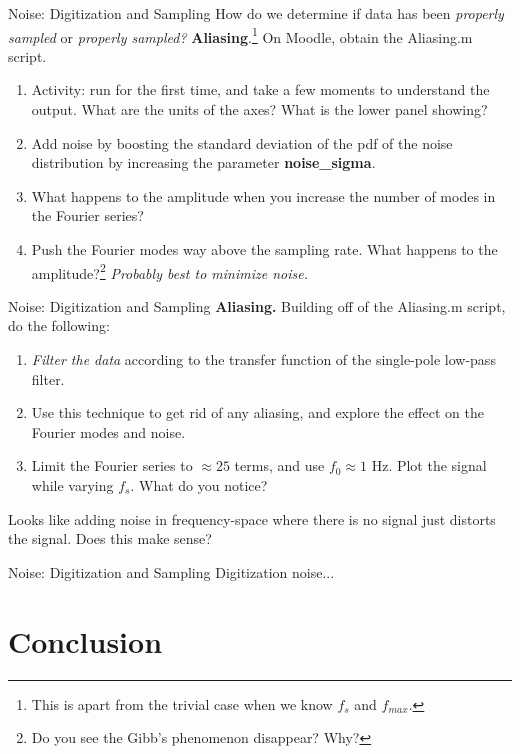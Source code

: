 \documentclass{beamer}
\begin{document}
\begin{frame}{Noise: Digitization and Sampling}
\small
How do we determine if data has been \textit{properly sampled} or \textit{properly sampled?} \textbf{Aliasing}.\footnote{This is apart from the trivial case when we know $f_s$ and $f_{max}$.} On Moodle, obtain the Aliasing.m script.
\begin{enumerate}
\item Activity: run for the first time, and take a few moments to understand the output. What are the units of the axes? What is the lower panel showing? 
\item Add noise by boosting the standard deviation of the pdf of the noise distribution by increasing the parameter \textbf{noise\_sigma}.
\item What happens to the amplitude when you increase the number of modes in the Fourier series?
\item Push the Fourier modes way above the sampling rate.  What happens to the amplitude?\footnote{Do you see the Gibb's phenomenon disappear?  Why?} \textit{Probably best to minimize noise.}
\end{enumerate}
\end{frame}

\begin{frame}{Noise: Digitization and Sampling}
\small
\textbf{Aliasing.} Building off of the Aliasing.m script, do the following:
\begin{enumerate}
\item \textit{Filter the data} according to the transfer function of the single-pole low-pass filter.
\item Use this technique to get rid of any aliasing, and explore the effect on the Fourier modes and noise.
\item Limit the Fourier series to $\approx 25$ terms, and use $f_0 \approx 1$ Hz.  Plot the signal while varying $f_{s}$.  What do you notice?
\end{enumerate}
Looks like adding noise in frequency-space where there is no signal just distorts the signal.  Does this make sense?
\end{frame}

\begin{frame}{Noise: Digitization and Sampling}
Digitization noise...
\end{frame}

\section{Conclusion}
\end{document}
